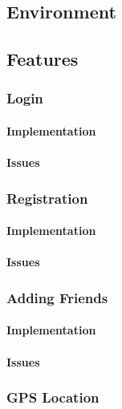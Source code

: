 \subsection{Environment}

\subsection{Features}


\subsubsection*{Login}

\paragraph*{Implementation}

\paragraph*{Issues}


\subsubsection*{Registration}

\paragraph*{Implementation}

\paragraph*{Issues}


\subsubsection*{Adding Friends}

\paragraph*{Implementation}

\paragraph*{Issues}


\subsubsection*{GPS Location}

